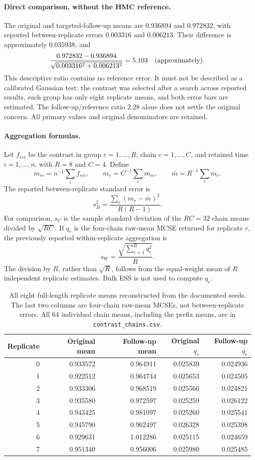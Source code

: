 \documentclass[11pt]{article}
\theoremstyle{definition}\newtheorem{definition}[theorem]{Definition}
\theoremstyle{remark}\newtheorem{remark}[theorem]{Remark}
\numberwithin{equation}{section}
\newcommand{\1}{\mathbf 1}
\begin{document}
\paragraph{Direct comparison, without the HMC reference.}
The original and targeted-follow-up means are $0.936894$ and $0.972832$, with reported between-replicate errors $0.003316$ and $0.006213$. Their difference is approximately $0.035938$, and
\[
 \frac{0.972832-0.936894}{\sqrt{0.003316^2+0.006213^2}}=5.103\quad\hbox{(approximately)}.
\]
This descriptive ratio contains no reference error. It must not be described as a calibrated Gaussian test: the contrast was selected after a search across reported results, each group has only eight replicate means, and both error bars are estimated. The follow-up/reference ratio $2.28$ alone does not settle the original concern. All primary values and original denominators are retained.

\paragraph{Aggregation formulas.}
Let $f_{rci}$ be the contrast in group $r=1,\ldots,R$, chain $c=1,\ldots,C$, and retained time $i=1,\ldots,n$, with $R=8$ and $C=4$. Define
\[
 m_{rc}=n^{-1}\sum_i f_{rci},\qquad m_r=C^{-1}\sum_c m_{rc},
 \qquad \bar m=R^{-1}\sum_r m_r.
\]
The reported between-replicate standard error is
\[
 s_B^2=\frac{\sum_r(m_r-\bar m)^2}{R(R-1)}.
\]
For comparison, $s_C$ is the sample standard deviation of the $RC=32$ chain means divided by $\sqrt{RC}$. If $q_r$ is the four-chain raw-mean MCSE returned for replicate $r$, the previously reported within-replicate aggregation is
\[
 s_W=\frac{\sqrt{\sum_{r=1}^R q_r^2}}{R}.
\]
The division by $R$, rather than $\sqrt R$, follows from the equal-weight mean of $R$ independent replicate estimates. Bulk ESS is not used to compute $q_r$.

\begin{table}[!htbp]\centering\small
\caption{All eight full-length replicate means reconstructed from the documented seeds. The last two columns are four-chain raw-mean MCSEs, not between-replicate errors. All 64 individual chain means, including the prefix means, are in \texttt{contrast\_chains.csv}.}\label{tab:all_replicates}
\begin{tabular}{rrrrr}\toprule
Replicate&Original mean&Follow-up mean&Original $q_r$&Follow-up $q_r$\\\midrule
0&0.933572&0.964911&0.025839&0.024936\\
1&0.922512&0.964744&0.025653&0.024505\\
2&0.933306&0.968519&0.025566&0.024821\\
3&0.935580&0.972597&0.025259&0.026122\\
4&0.943425&0.981097&0.025260&0.025541\\
5&0.945790&0.962497&0.026328&0.025398\\
6&0.929631&1.012286&0.025115&0.024659\\
7&0.951340&0.956006&0.025980&0.025485\\
\bottomrule\end{tabular}\end{table}
\end{document}
